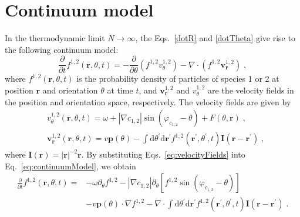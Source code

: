 \documentclass{article}
\begin{document}
\section{Continuum model}
In the thermodynamic limit $N\rightarrow \infty$, the Eqs.~\eqref{dotR} and \eqref{dotTheta} give rise to the following continuum model:
\begin{equation}
    \frac{\partial}{\partial t}f ^{1,2}\left( \mathbf{r},\theta ,t \right) =-\frac{\partial}{\partial \theta}\left( f ^{1,2}v_{\theta}^{1,2} \right) -\nabla \cdot \left( f ^{1,2}\mathbf{v}_{\mathbf{r}}^{1,2} \right) \;, \label{eq:continuumModel}
\end{equation}
where $f^{1,2}\left( \mathbf{r},\theta ,t \right)$ is the probability density of particles of species 1 or 2 at position $\mathbf{r}$ and orientation $\theta$ at time $t$, and $\mathbf{v}_{\mathbf{r}}^{1,2}$ and $v_{\theta}^{1,2}$ are the velocity fields in the position and orientation space, respectively. The velocity fields are given by
\begin{subequations}
    \begin{align}
        &v_{\theta}^{1,2}\left( \mathbf{r},\theta ,t \right) =\omega +\left| \nabla c_{1,2} \right|\sin \left( \varphi _{c_{1,2}} -\theta \right) +F\left( \theta ,\mathbf{r} \right)  \;,\\
        &\mathbf{v}_{\mathbf{r}}^{1,2}\left( \mathbf{r},\theta ,t \right) =v\mathbf{p}\left( \theta \right) -\int{\mathrm{d}\theta ^{\prime} \mathrm{d}\mathbf{r}^{\prime} f ^{1,2}\left( \mathbf{r}^{\prime} ,\theta ^{\prime} ,t \right) \mathbf{I}\left( \mathbf{r}-\mathbf{r}^{\prime} \right)} \;,
    \end{align}
    \label{eq:velocityFields}
\end{subequations}
where $\mathbf{I}\left( \mathbf{r} \right)=|\mathbf{r}|^{-2}\mathbf{r}$. By substituting Eqs.~\eqref{eq:velocityFields} into Eq.~\eqref{eq:continuumModel}, we obtain
\begin{equation}
    \begin{aligned}
        \frac{\partial}{\partial t}f ^{1,2}\left( \mathbf{r},\theta ,t \right) =&-\omega \partial _{\theta}f ^{1,2}-\left| \nabla c_{1,2} \right|\partial _{\theta}\left[ f ^{1,2}\sin \left( \varphi _{c_{1,2}}-\theta \right) \right]\\
        &-v\mathbf{p}\left( \theta \right) \cdot \nabla f ^{1,2}-\nabla \cdot \int{\mathrm{d}\theta ^{\prime} \mathrm{d}\mathbf{r}^{\prime} f ^{1,2}\left( \mathbf{r}^{\prime} ,\theta ^{\prime} ,t \right) \mathbf{I}\left( \mathbf{r}-\mathbf{r}^{\prime} \right)}\;.
    \end{aligned}
\end{equation}
\end{document}

